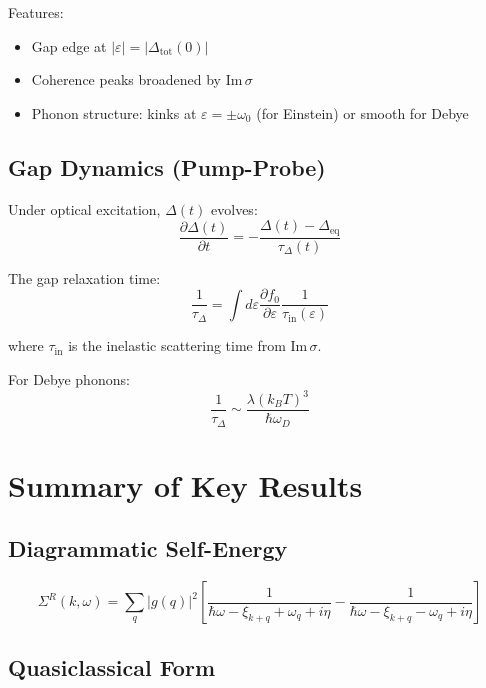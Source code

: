 \documentclass[12pt]{article}
\begin{document}
Features:
\begin{itemize}
\item Gap edge at $|\varepsilon| = |\Delta_{\text{tot}}(0)|$
\item Coherence peaks broadened by $\text{Im}\,\sigma$
\item Phonon structure: kinks at $\varepsilon = \pm\omega_0$ (for Einstein) or smooth for Debye
\end{itemize}

\subsection{Gap Dynamics (Pump-Probe)}

Under optical excitation, $\Delta(t)$ evolves:
\begin{equation}
\frac{\partial\Delta(t)}{\partial t} = -\frac{\Delta(t) - \Delta_{\text{eq}}}{\tau_\Delta(t)}
\end{equation}

The gap relaxation time:
\begin{equation}
\boxed{
\frac{1}{\tau_\Delta} = \int d\varepsilon \frac{\partial f_0}{\partial \varepsilon} \frac{1}{\tau_{\text{in}}(\varepsilon)}
}
\end{equation}

where $\tau_{\text{in}}$ is the inelastic scattering time from $\text{Im}\,\sigma$.

For Debye phonons:
\begin{equation}
\frac{1}{\tau_\Delta} \sim \frac{\lambda(k_B T)^3}{\hbar\omega_D}
\end{equation}

\section{Summary of Key Results}

\subsection{Diagrammatic Self-Energy}

\begin{equation}
\Sigma^R(k,\omega) = \sum_q |g(q)|^2 \left[\frac{1}{\hbar\omega - \xi_{k+q} + \omega_q + i\eta} - \frac{1}{\hbar\omega - \xi_{k+q} - \omega_q + i\eta}\right]
\end{equation}

\subsection{Quasiclassical Form}
\end{document}
